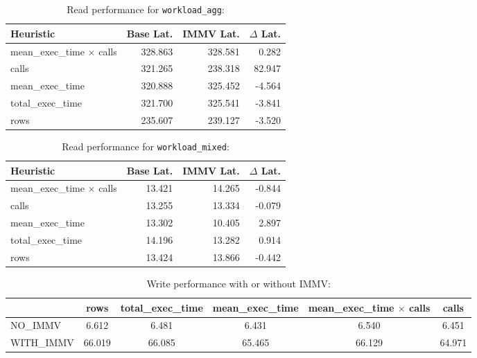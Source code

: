 \begin{table}[t]
\centering

\label{tab:agg}
\begin{tabular}{lrrr}
\hline
Heuristic &
Base Lat. &
IMMV Lat. &
$\Delta$ Lat.\\
\hline
mean\_exec\_time $\times$ calls & 328.863 & 328.581 & 0.282 \\
calls                         & 321.265 & 238.318 & 82.947 \\
mean\_exec\_time              & 320.888 & 325.452 & -4.564 \\
total\_exec\_time             & 321.700 & 325.541 & -3.841 \\
rows                          & 235.607 & 239.127 & -3.520 \\
\hline
\end{tabular}
\caption{Read performance for \texttt{workload\_agg}:}
\end{table}

\begin{table}[t]
\centering

\label{tab:mixed}
\begin{tabular}{lrrr}
\hline
Heuristic &
Base Lat. &
IMMV Lat. &
$\Delta$ Lat. \\
\hline
mean\_exec\_time $\times$ calls & 13.421 & 14.265 & -0.844 \\
calls                         & 13.255 & 13.334 & -0.079 \\
mean\_exec\_time              & 13.302 & 10.405 & 2.897 \\
total\_exec\_time             & 14.196 & 13.282 & 0.914 \\
rows                          & 13.424 & 13.866 & -0.442 \\
\hline
\end{tabular}
\caption{Read performance for \texttt{workload\_mixed}:}
\end{table}


\begin{table}[t]
\centering

\label{tab:write_bench}
\begin{tabular}{|l|c|c|c|c|c|}
\hline
 & rows & total\_exec\_time &mean\_exec\_time & mean\_exec\_time $\times$ calls & calls \\
\hline
NO\_IMMV 
& 6.612 
& 6.481 
& 6.431 
& 6.540 
& 6.451 
\\
WITH\_IMMV 
& 66.019
& 66.085
& 65.465
& 66.129
& 64.971\\
\hline
\end{tabular}
\caption{Write performance with or without IMMV:}
\end{table}

